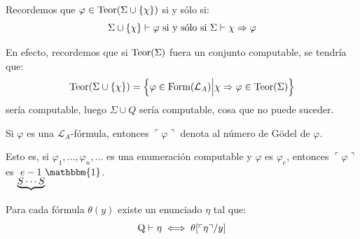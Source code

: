 \documentclass[12pt]{report}
\theoremstyle{largebreak}
\newcommand{\bbm}[1]{\ensuremath{\mathbbm{#1}}}
\newcommand{\winecomma}[1]{\ensuremath{\ulcorner#1\urcorner}}
\begin{document}
    \begin{obs}
        Recordemos que $\varphi\in\textup{Teor}(\Sigma\cup\left\{\chi\right\})$ si y sólo si:
        \begin{equation*}
            \Sigma\cup\left\{\chi \right\}\vdash\varphi\textup{ si y sólo si }\Sigma\vdash\chi\Rightarrow\varphi
        \end{equation*}
    \end{obs}
    
    En efecto, recordemos que si $\textup{Teor}(\Sigma)$ fuera un conjunto computable, se tendría que:
    \begin{equation*}
        \textup{Teor}(\Sigma\cup\left\{\chi\right\})=\left\{\varphi\in\textup{Form}(\mathcal{L}_A)\Big|\chi\Rightarrow\varphi\in\textup{Teor}(\Sigma) \right\}
    \end{equation*}
    sería computable, luego $\Sigma\cup Q$ sería computable, cosa que no puede suceder.

    \begin{obs}
        Si $\varphi$ es una $\mathcal{L}_A$-fórmula, entonces $\winecomma{\varphi}$ denota al número de Gödel de $\varphi$.
        
        Esto es, si $\varphi_1,...,\varphi_n,...$ es una enumeración computable y $\varphi$ es $\varphi_e$, entonces $\winecomma{\varphi}$ es $\underset{\underbrace{S\cdots S}}{e-1}\bbm{1}$.
    \end{obs}

    \begin{lema}
        Para cada fórmula $\theta(y)$ existe un enunciado $\eta$ tal que:
        \begin{equation*}
            \textup{Q}\vdash\eta\iff\theta[\winecomma{\eta}/y]
        \end{equation*}
    \end{lema}

    \newcommand{\RA}{\textup{Q}}
\end{document}
